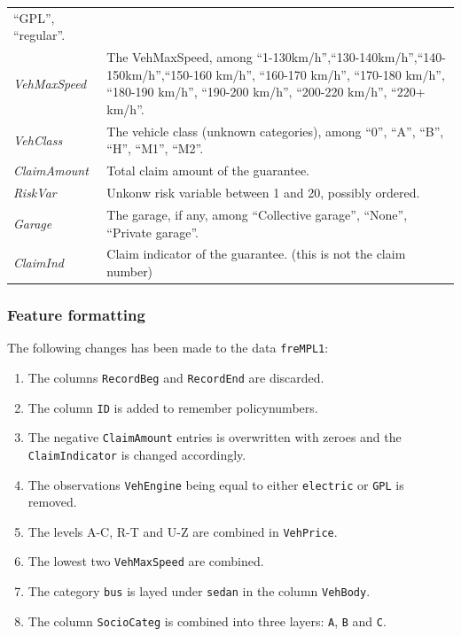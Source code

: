 \documentclass[
]{article}
\providecommand{\tightlist}{%
  \setlength{\itemsep}{0pt}\setlength{\parskip}{0pt}}
\begin{document}
\begin{longtable}[]{@{}
  >{\raggedright\arraybackslash}p{}
  >{\raggedright\arraybackslash}p{}@{}}
``GPL'', ``regular''. \\
\emph{VehMaxSpeed} & The VehMaxSpeed, among
``1-130km/h'',``130-140km/h'',``140-150km/h'',``150-160 km/h'',
``160-170 km/h'', ``170-180 km/h'', ``180-190 km/h'', ``190-200 km/h'',
``200-220 km/h'', ``220+ km/h''. \\
\emph{VehClass} & The vehicle class (unknown categories), among ``0'',
``A'', ``B'', ``H'', ``M1'', ``M2''. \\
\emph{ClaimAmount} & Total claim amount of the guarantee. \\
\emph{RiskVar} & Unkonw risk variable between 1 and 20, possibly
ordered. \\
\emph{Garage} & The garage, if any, among ``Collective garage'',
``None'', ``Private garage''. \\
\emph{ClaimInd} & Claim indicator of the guarantee. (this is not the
claim number) \\
\bottomrule()
\end{longtable}

\hypertarget{feature-formatting}{%
\subsubsection{Feature formatting}\label{feature-formatting}}

The following changes has been made to the data \texttt{freMPL1}:

\begin{enumerate}
\def\labelenumi{\arabic{enumi}.}
\tightlist
\item
  The columns \texttt{RecordBeg} and \texttt{RecordEnd} are discarded.
\item
  The column \texttt{ID} is added to remember policynumbers.
\item
  The negative \texttt{ClaimAmount} entries is overwritten with zeroes
  and the \texttt{ClaimIndicator} is changed accordingly.
\item
  The observations \texttt{VehEngine} being equal to either
  \texttt{electric} or \texttt{GPL} is removed.
\item
  The levels A-C, R-T and U-Z are combined in \texttt{VehPrice}.
\item
  The lowest two \texttt{VehMaxSpeed} are combined.
\item
  The category \texttt{bus} is layed under \texttt{sedan} in the column
  \texttt{VehBody}.
\item
  The column \texttt{SocioCateg} is combined into three layers:
  \texttt{A}, \texttt{B} and \texttt{C}.
\end{enumerate}
\end{document}
